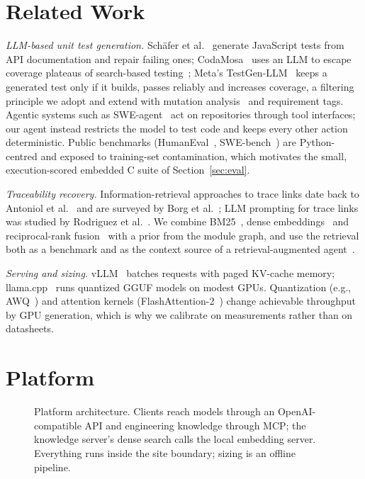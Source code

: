 \documentclass[conference]{IEEEtran}
\begin{document}
\section{Related Work}
\emph{LLM-based unit test generation.} Sch\"afer et al.~\cite{schafer2024testpilot} generate JavaScript tests from
API documentation and repair failing ones; CodaMosa~\cite{lemieux2023codamosa} uses an LLM to escape coverage
plateaus of search-based testing~\cite{fraser2011evosuite}; Meta's TestGen-LLM~\cite{alshahwan2024meta} keeps a
generated test only if it builds, passes reliably and increases coverage, a filtering principle we adopt and extend
with mutation analysis~\cite{jia2011mutation} and requirement tags. Agentic systems such as
SWE-agent~\cite{yang2024sweagent} act on repositories through tool interfaces; our agent instead restricts the
model to test code and keeps every other action deterministic. Public benchmarks (HumanEval~\cite{chen2021codex},
SWE-bench~\cite{jimenez2024swebench}) are Python-centred and exposed to training-set contamination, which motivates
the small, execution-scored embedded C suite of Section~\ref{sec:eval}.

\emph{Traceability recovery.} Information-retrieval approaches to trace links date back to Antoniol et
al.~\cite{antoniol2002traceability} and are surveyed by Borg et al.~\cite{borg2014traceability}; LLM prompting for
trace links was studied by Rodriguez et al.~\cite{rodriguez2023prompts}. We combine BM25~\cite{robertson2009bm25},
dense embeddings~\cite{zhang2025qwen3embedding} and reciprocal-rank fusion~\cite{cormack2009rrf} with a prior from
the module graph, and use the retrieval both as a benchmark and as the context source of a retrieval-augmented
agent~\cite{lewis2020rag}.

\emph{Serving and sizing.} vLLM~\cite{kwon2023vllm} batches requests with paged KV-cache memory; llama.cpp~\cite{llamacpp}
runs quantized GGUF models on modest GPUs. Quantization (e.g., AWQ~\cite{lin2024awq}) and attention kernels
(FlashAttention-2~\cite{dao2024flashattention2}) change achievable throughput by GPU generation, which is why we
calibrate on measurements rather than on datasheets.

\section{Platform}
\begin{figure}[t]
\centering

\caption{Platform architecture. Clients reach models through an OpenAI-compatible API and engineering knowledge
through MCP; the knowledge server's dense search calls the local embedding server. Everything runs inside the
site boundary; sizing is an offline pipeline.}
\label{fig:arch}
\end{figure}
\end{document}
